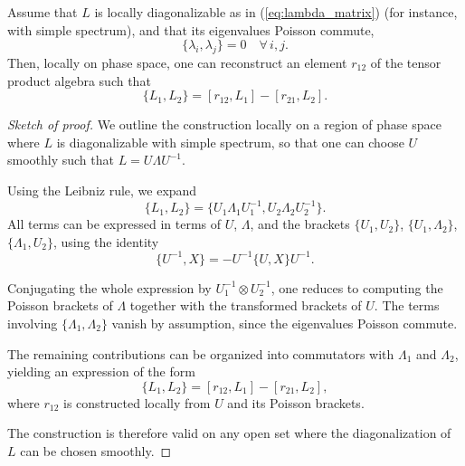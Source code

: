\begin{proposition}\label{prop:existence_rmatrix}
    Assume that $L$ is locally diagonalizable as in (\ref{eq:lambda_matrix}) (for instance, with simple spectrum), and that its eigenvalues Poisson commute,
    \begin{equation}
        \{\lambda_i,\lambda_j\}=0 \quad \forall \, i,j.
    \end{equation}
    Then, locally on phase space, one can reconstruct an element $r_{12}$ of the tensor product algebra such that
    \begin{equation}\label{eq:r_matrix}
        \{L_1, L_2\} = [r_{12}, L_1] - [r_{21}, L_2].
    \end{equation}
\end{proposition}

\begin{proof}[Sketch of proof]
We outline the construction locally on a region of phase space where $L$ is diagonalizable with simple spectrum, so that one can choose $U$ smoothly such that $L = U \Lambda U^{-1}$.

Using the Leibniz rule, we expand
\begin{equation}
    \{L_1,L_2\} = \{U_1 \Lambda_1 U_1^{-1}, U_2 \Lambda_2 U_2^{-1}\}.
\end{equation}
All terms can be expressed in terms of $U$, $\Lambda$, and the brackets $\{U_1,U_2\}$, $\{U_1,\Lambda_2\}$, $\{\Lambda_1,U_2\}$, using the identity
\begin{equation}
    \{U^{-1},X\} = - U^{-1} \{U,X\} U^{-1}.
\end{equation}

Conjugating the whole expression by $U_1^{-1} \otimes U_2^{-1}$, one reduces to computing the Poisson brackets of $\Lambda$ together with the transformed brackets of $U$. The terms involving $\{\Lambda_1,\Lambda_2\}$ vanish by assumption, since the eigenvalues Poisson commute.

The remaining contributions can be organized into commutators with $\Lambda_1$ and $\Lambda_2$, yielding an expression of the form
\begin{equation}
    \{L_1,L_2\} = [r_{12},L_1] - [r_{21},L_2],
\end{equation}
where $r_{12}$ is constructed locally from $U$ and its Poisson brackets.

The construction is therefore valid on any open set where the diagonalization of $L$ can be chosen smoothly.
\end{proof}
